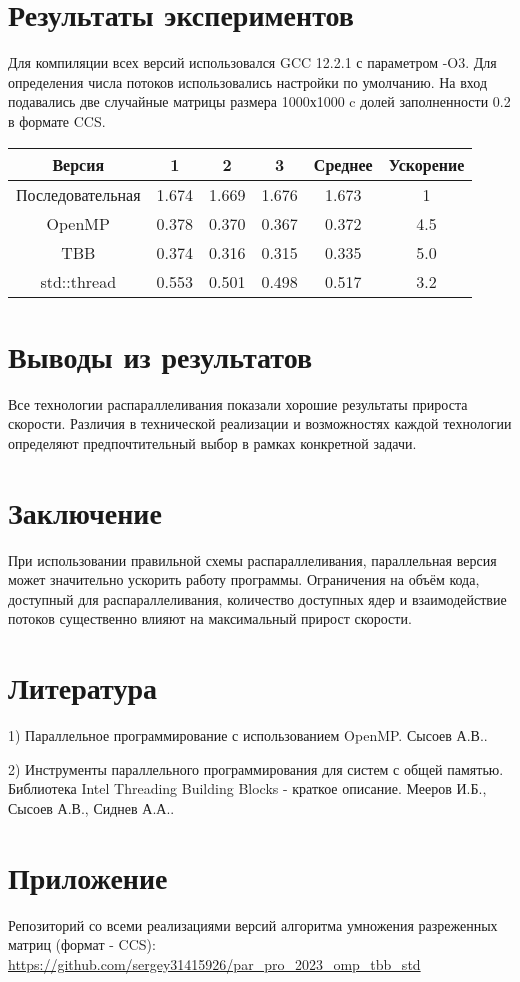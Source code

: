 \documentclass[12pt]{article}
\begin{document}
\section*{Результаты экспериментов}
Для компиляции всех версий использовался GCC 12.2.1 с параметром -O3. Для определения числа потоков использовались настройки по умолчанию. На вход подавались две случайные матрицы размера 1000х1000 c долей заполненности 0.2 в формате CCS.

\begin{tabular}{|c||c|c|c||c|c|} \hline
Версия & 1  & 2  & 3  & Среднее & Ускорение \\ \hline \hline
 Последовательная & 1.674 & 1.669 & 1.676 & 1.673 & 1 \\ \hline
 OpenMP           & 0.378 & 0.370 & 0.367 & 0.372 & 4.5 \\ \hline
 TBB              & 0.374 & 0.316 & 0.315 & 0.335 & 5.0 \\ \hline
 std::thread      & 0.553 & 0.501 & 0.498 & 0.517 & 3.2 \\ \hline
\end{tabular}

\section*{Выводы из результатов}
Все технологии распараллеливания показали хорошие результаты прироста скорости. Различия в технической реализации и возможностях каждой технологии определяют предпочтительный выбор в рамках конкретной задачи.

\section*{Заключение}
При использовании правильной схемы распараллеливания,  параллельная версия может значительно ускорить работу программы. Ограничения на объём кода, доступный для распараллеливания, количество доступных ядер и взаимодействие потоков существенно влияют на максимальный прирост скорости.

\section*{Литература}

1) Параллельное программирование с использованием OpenMP. Сысоев А.В..

2) Инструменты параллельного программирования для систем с общей памятью. Библиотека Intel Threading Building Blocks - краткое описание. Мееров И.Б., Сысоев А.В., Сиднев А.А..

\section*{Приложение}

Репозиторий со всеми реализациями версий алгоритма умножения разреженных матриц (формат - CCS): \url{https://github.com/sergey31415926/par_pro_2023_omp_tbb_std}
\end{document}
